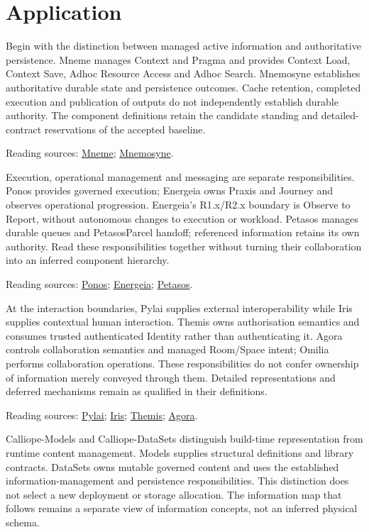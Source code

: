 \part{Application}
Begin with the distinction between managed active information and authoritative persistence. Mneme manages Context and Pragma and provides Context Load, Context Save, Adhoc Resource Access and Adhoc Search. Mnemosyne establishes authoritative durable state and persistence outcomes. Cache retention, completed execution and publication of outputs do not independently establish durable authority. The component definitions retain the candidate standing and detailed-contract reservations of the accepted baseline.

{\small Reading sources: \hyperref[element:1af8a56358f7429fabfb57be66542a99]{Mneme}; \hyperref[element:7985e647bf9e4ca3ba70faf9e3e4ae02]{Mnemosyne}.}\par
Execution, operational management and messaging are separate responsibilities. Ponos provides governed execution; Energeia owns Praxis and Journey and observes operational progression. Energeia's R1.x/R2.x boundary is Observe to Report, without autonomous changes to execution or workload. Petasos manages durable queues and PetasosParcel handoff; referenced information retains its own authority. Read these responsibilities together without turning their collaboration into an inferred component hierarchy.

{\small Reading sources: \hyperref[element:b521762c1ea444b48cd5f66be3752d30]{Ponos}; \hyperref[element:fb3f37a6ac614415ac486a6de9d35994]{Energeia}; \hyperref[element:195e5f10db8e419391354197b5d7a8cc]{Petasos}.}\par
At the interaction boundaries, Pylai supplies external interoperability while Iris supplies contextual human interaction. Themis owns authorisation semantics and consumes trusted authenticated Identity rather than authenticating it. Agora controls collaboration semantics and managed Room/Space intent; Omilia performs collaboration operations. These responsibilities do not confer ownership of information merely conveyed through them. Detailed representations and deferred mechanisms remain as qualified in their definitions.

{\small Reading sources: \hyperref[element:e3e4147fea3640198dc251ed41ee854d]{Pylai}; \hyperref[element:e927c1af96c64fcd979be659bee2cbe3]{Iris}; \hyperref[element:899d34ec491948b68aad09e507dea6d1]{Themis}; \hyperref[element:d1c4053e68384080b8eb79d2008632ba]{Agora}.}\par
Calliope-Models and Calliope-DataSets distinguish build-time representation from runtime content management. Models supplies structural definitions and library contracts. DataSets owns mutable governed content and uses the established information-management and persistence responsibilities. This distinction does not select a new deployment or storage allocation. The information map that follows remains a separate view of information concepts, not an inferred physical schema.

